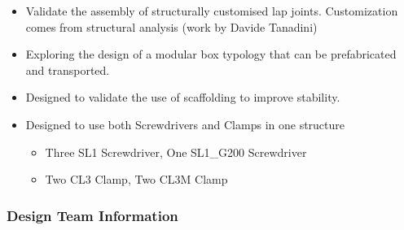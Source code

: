 \documentclass[11pt]{book}
\begin{document}
\begin{itemize}
	\item Validate the assembly of structurally customised lap joints. Customization comes from structural analysis (work by Davide Tanadini)

	\item Exploring the design of a modular box typology that can be prefabricated and transported.

	\item Designed to validate the use of scaffolding to improve stability.

	\item Designed to use both Screwdrivers and Clamps in one structure

\begin{itemize}
	\item Three SL1 Screwdriver, One SL1\_G200 Screwdriver

	\item Two CL3 Clamp, Two CL3M Clamp

\end{itemize}
\end{itemize}
\subsubsection{Design Team Information}
\end{document}
